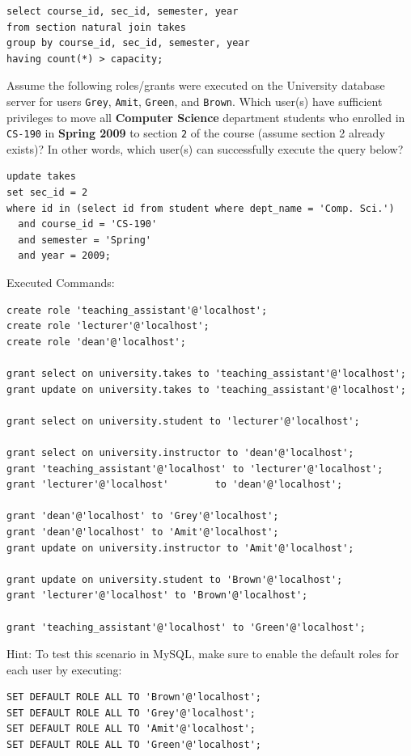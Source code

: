 \documentclass[12pt]{exam}
\begin{document}
\begin{questions}
\begin{choices}
  \choice
\begin{verbatim}
select course_id, sec_id, semester, year
from section natural join takes
group by course_id, sec_id, semester, year
having count(*) > capacity;
\end{verbatim}

\end{choices}

\question[4] Assume the following roles/grants were executed on the University database server for users \texttt{Grey}, \texttt{Amit}, \texttt{Green}, and \texttt{Brown}. Which user(s) have sufficient privileges to move all \textbf{Computer Science} department students who enrolled in \texttt{CS-190} in \textbf{Spring 2009} to section \texttt{2} of the course (assume section 2 already exists)? In other words, which user(s) can successfully execute the query below?


\begin{verbatim}
update takes
set sec_id = 2
where id in (select id from student where dept_name = 'Comp. Sci.')
  and course_id = 'CS-190'
  and semester = 'Spring'
  and year = 2009;
\end{verbatim}

Executed Commands:
\begin{verbatim}
create role 'teaching_assistant'@'localhost';
create role 'lecturer'@'localhost';
create role 'dean'@'localhost';

grant select on university.takes to 'teaching_assistant'@'localhost';
grant update on university.takes to 'teaching_assistant'@'localhost';

grant select on university.student to 'lecturer'@'localhost';

grant select on university.instructor to 'dean'@'localhost';
grant 'teaching_assistant'@'localhost' to 'lecturer'@'localhost';
grant 'lecturer'@'localhost'        to 'dean'@'localhost';

grant 'dean'@'localhost' to 'Grey'@'localhost';
grant 'dean'@'localhost' to 'Amit'@'localhost';
grant update on university.instructor to 'Amit'@'localhost';

grant update on university.student to 'Brown'@'localhost';
grant 'lecturer'@'localhost' to 'Brown'@'localhost';

grant 'teaching_assistant'@'localhost' to 'Green'@'localhost';
\end{verbatim}

Hint: To test this scenario in MySQL, make sure to enable the default roles for each user by executing:
\begin{verbatim}
SET DEFAULT ROLE ALL TO 'Brown'@'localhost';
SET DEFAULT ROLE ALL TO 'Grey'@'localhost';
SET DEFAULT ROLE ALL TO 'Amit'@'localhost';
SET DEFAULT ROLE ALL TO 'Green'@'localhost';
\end{verbatim}


\end{questions}
\end{document}
